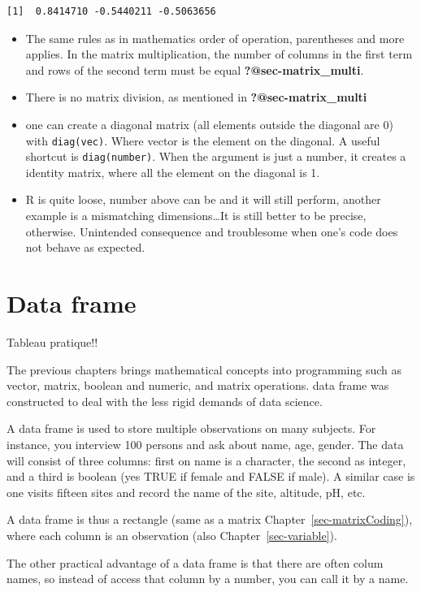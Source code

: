 \documentclass[
  letterpaper,
  DIV=11,
  numbers=noendperiod]{scrreprt}
\providecommand{\tightlist}{%
  \setlength{\itemsep}{0pt}\setlength{\parskip}{0pt}}
\begin{document}
\begin{verbatim}
[1]  0.8414710 -0.5440211 -0.5063656
\end{verbatim}

\begin{itemize}
\tightlist
\item
  The same rules as in mathematics order of operation, parentheses and
  more applies. In the matrix multiplication, the number of columns in
  the first term and rows of the second term must be equal
  \textbf{?@sec-matrix\_multi}.
\item
  There is no matrix division, as mentioned in
  \textbf{?@sec-matrix\_multi}
\item
  one can create a diagonal matrix (all elements outside the diagonal
  are 0) with \texttt{diag(vec)}. Where vector is the element on the
  diagonal. A useful shortcut is \texttt{diag(number)}. When the
  argument is just a number, it creates a identity matrix, where all the
  element on the diagonal is 1.
\item
  R is quite loose, number above can be and it will still perform,
  another example is a mismatching dimensions\ldots It is still better
  to be precise, otherwise. Unintended consequence and troublesome when
  one's code does not behave as expected.
\end{itemize}

\chapter{Data frame}\label{sec-dataframe}

Tableau pratique!!

The previous chapters brings mathematical concepts into programming such
as vector, matrix, boolean and numeric, and matrix operations. data
frame was constructed to deal with the less rigid demands of data
science.

A data frame is used to store multiple observations on many subjects.
For instance, you interview 100 persons and ask about name, age, gender.
The data will consist of three columns: first on name is a character,
the second as integer, and a third is boolean (yes TRUE if female and
FALSE if male). A similar case is one visits fifteen sites and record
the name of the site, altitude, pH, etc.

A data frame is thus a rectangle (same as a matrix
Chapter~\ref{sec-matrixCoding}), where each column is an observation
(also Chapter~\ref{sec-variable}).

The other practical advantage of a data frame is that there are often
colum names, so instead of access that column by a number, you can call
it by a name.
\end{document}
